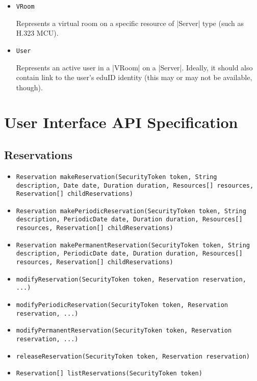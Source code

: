 \documentclass[a4paper]{report}
\newcommand{\APIcmd}[1]{\item \lstinline[style=myinline]!#1!}
\newenvironment{APIdef}{\begin{itemize}}{\end{itemize}}
\begin{document}
\begin{APIdef}


\APIcmd{VRoom}

Represents a virtual room on a specific resource of |Server| type (such as H.323 MCU).

\APIcmd{User}

Represents an active user in a |VRoom| on a |Server|. Ideally, it should also contain link to the user's eduID identity (this may or may not be available, though).

\end{APIdef}




\chapter{User Interface API Specification}

\section{Reservations}

\begin{APIdef}

\APIcmd{Reservation makeReservation(SecurityToken token, String description, Date date, Duration duration, Resources[] resources, Reservation[] childReservations)}

\APIcmd{Reservation makePeriodicReservation(SecurityToken token, String description, PeriodicDate date, Duration duration, Resources[] resources, Reservation[] childReservations)}

\APIcmd{Reservation makePermanentReservation(SecurityToken token, String description, PeriodicDate date, Duration duration, Resources[] resources, Reservation[] childReservations)}

\APIcmd{modifyReservation(SecurityToken token, Reservation reservation, ...)}

\APIcmd{modifyPeriodicReservation(SecurityToken token, Reservation reservation, ...)}

\APIcmd{modifyPermanentReservation(SecurityToken token, Reservation reservation, ...)}

\APIcmd{releaseReservation(SecurityToken token, Reservation reservation)}

\APIcmd{Reservation[] listReservations(SecurityToken token)}

\end{APIdef}
\end{document}
